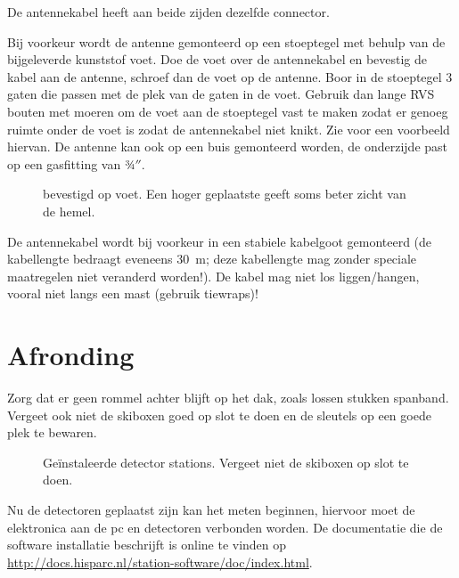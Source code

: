 De \gps antennekabel heeft aan beide zijden dezelfde connector.

Bij voorkeur wordt de \gps antenne gemonteerd op een stoeptegel met
behulp van de bijgeleverde kunststof voet. Doe de voet over de \gps
antennekabel en bevestig de kabel aan de \gps antenne, schroef dan de
voet op de \gps antenne. Boor in de stoeptegel 3 gaten die passen met de
plek van de gaten in de \gps voet. Gebruik dan lange RVS bouten met
moeren om de voet aan de stoeptegel vast te maken zodat er genoeg ruimte
onder de voet is zodat de antennekabel niet knikt. Zie
 voor een voorbeeld hiervan. De \gps antenne
kan ook op een buis gemonteerd worden, de onderzijde past op een
gasfitting van 3⁄4$''$.

\begin{figure}
    \centering
    \caption{\gps bevestigd op voet. Een hoger geplaatste \gps geeft
             soms beter zicht van de hemel.}
\end{figure}

De \gps antennekabel wordt bij voorkeur in een stabiele kabelgoot
gemonteerd (de \gps kabellengte bedraagt eveneens \SI{30}{\meter}; deze
kabellengte mag zonder speciale maatregelen niet veranderd worden!). De
kabel mag niet los liggen/hangen, vooral niet langs een mast (gebruik
tiewraps)!


\section{Afronding}

Zorg dat er geen rommel achter blijft op het dak, zoals lossen stukken
spanband. Vergeet ook niet de skiboxen goed op slot te doen en de
sleutels op een goede plek te bewaren.

\begin{figure}
    \centering
    \caption{Geïnstaleerde detector stations. Vergeet niet de skiboxen
             op slot te doen.}
\end{figure}

Nu de detectoren geplaatst zijn kan het meten beginnen, hiervoor moet de
\hisparc elektronica aan de pc en detectoren verbonden worden. De
documentatie die de software installatie beschrijft is online te vinden
op \url{http://docs.hisparc.nl/station-software/doc/index.html}.




